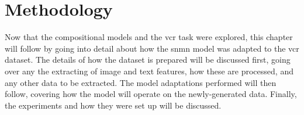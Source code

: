\chapter{Methodology}
\label{chp:methodology}

Now that the compositional models and the \gls{vcr} task were explored, this chapter will follow by going into detail about how the \gls{snmn} model was adapted to the \gls{vcr} dataset.
The details of how the dataset is prepared will be discussed first, going over any the extracting of image and text features, how these are processed, and any other data to be extracted.
The model adaptations performed will then follow, covering how the model will operate on the newly-generated data.
Finally, the experiments and how they were set up will be discussed.



\clearpage


\clearpage


